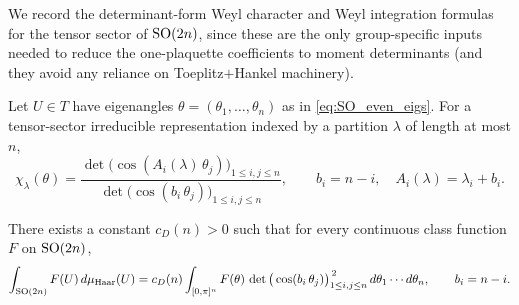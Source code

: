 We record the determinant-form Weyl character and Weyl integration formulas for the tensor sector of $\mathrm{SO}(2n)$,
since these are the only group-specific inputs needed to reduce the one-plaquette coefficients to moment determinants
(and they avoid any reliance on Toeplitz$+$Hankel machinery).

\begin{lemma}
\label{lem:SOeven_character_cosine}
Let $U\in T$ have eigenangles $\theta=(\theta_1,\dots,\theta_n)$ as in \eqref{eq:SO_even_eigs}.
For a tensor-sector irreducible representation indexed by a partition $\lambda$ of length at most $n$,
\begin{equation}
\label{eq:SOeven_character_formula}
\chi_{\lambda}(\theta)
=\frac{\det\big(\cos(A_i(\lambda)\,\theta_j)\big)_{1\le i,j\le n}}
        {\det\big(\cos(b_i\,\theta_j)\big)_{1\le i,j\le n}},
\qquad b_i=n-i,\quad A_i(\lambda)=\lambda_i+b_i.
\end{equation}
\end{lemma}

\begin{lemma}
\label{lem:SOeven_weyl_integration}
There exists a constant $c_{D}(n)>0$ such that for every continuous class function $F$ on $\mathrm{SO}(2n)$,
\begin{equation}
\label{eq:SOeven_weyl_integration}
\int_{\mathrm{SO}(2n)}F(U)\,d\mu_{\mathrm{Haar}}(U)
= c_{D}(n)\int_{[0,\pi]^n}F(\theta)\,
\det\big(\cos(b_i\,\theta_j)\big)_{1\le i,j\le n}^{\,2}\,d\theta_1\cdots d\theta_n,
\qquad b_i=n-i.
\end{equation}
\end{lemma}

